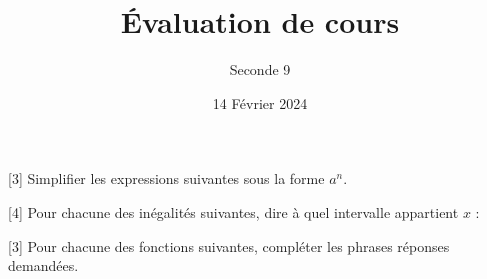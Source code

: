 \documentclass{exam}
\title{Évaluation de cours}
\author{Seconde 9}
\date{14 Février 2024}
\begin{document}
\maketitle
\begin{questions}
[3] Simplifier les expressions suivantes sous la forme $a^n$.
\vspace*{0.5cm}
[4]
Pour chacune des inégalités suivantes, dire à quel intervalle appartient $x$ :
\vspace*{0.5cm}
[3]
Pour chacune des fonctions suivantes, compléter les phrases réponses demandées.
\begin{parts}

\end{parts}
\end{questions}
\end{document}
